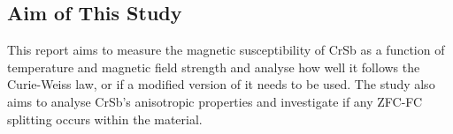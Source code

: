    \subsection{Aim of This Study} %
    This report aims to measure the magnetic susceptibility of CrSb as a function of temperature and magnetic field strength and analyse how well it follows the Curie-Weiss law, or if a modified version of it needs to be used. The study also aims to analyse CrSb's anisotropic properties and investigate if any ZFC-FC splitting occurs within the material.



